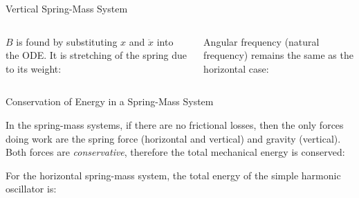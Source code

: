 \documentclass[12pt,compress,aspectratio=169]{beamer}
\begin{document}
\begin{frame}{Vertical Spring-Mass System}
  \vspace{.2in}
  \begin{columns}

    $B$ is found by substituting $x$ and $\ddot x$ into the ODE.
    It is stretching of the spring due to its weight:
    

    Angular frequency (natural frequency) remains the same as the horizontal
    case:

  \end{columns}
\end{frame}



\begin{frame}{Conservation of Energy in a Spring-Mass System}

  In the spring-mass systems, if there are no frictional losses, then the only
  forces doing work are the spring force (horizontal and vertical) and gravity
  (vertical). Both forces are \emph{conservative}, therefore the total
  mechanical energy is conserved:

  
  For the horizontal spring-mass system, the total energy of the simple harmonic
  oscillator is:
    
\end{frame}
\end{document}
